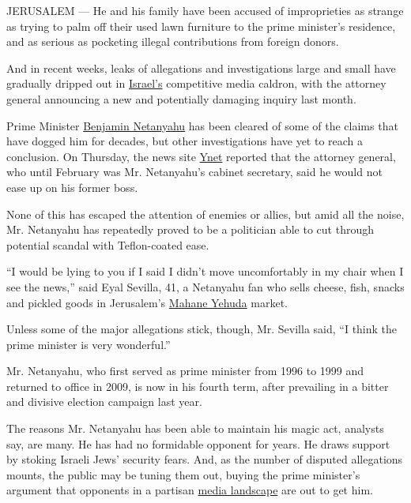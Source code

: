 JERUSALEM --- He and his family have been accused of improprieties as
strange as trying to palm off their used lawn furniture to the prime
minister's residence, and as serious as pocketing illegal contributions
from foreign donors.

And in recent weeks, leaks of allegations and investigations large and
small have gradually dripped out in
\href{http://www.nytimes.com/topic/destination/israel?inline=nyt-geo}{Israel's}
competitive media caldron, with the attorney general announcing a new
and potentially damaging inquiry last month.

Prime Minister
\href{http://www.nytimes.com/topic/person/benjamin-netanyahu?8qa}{Benjamin
Netanyahu} has been cleared of some of the claims that have dogged him
for decades, but other investigations have yet to reach a conclusion. On
Thursday, the news site
\href{http://www.ynetnews.com/home/0,7340,L-3083,00.html}{Ynet} reported
that the attorney general, who until February was Mr. Netanyahu's
cabinet secretary, said he would not ease up on his former boss.

None of this has escaped the attention of enemies or allies, but amid
all the noise, Mr. Netanyahu has repeatedly proved to be a politician
able to cut through potential scandal with Teflon-coated ease.

``I would be lying to you if I said I didn't move uncomfortably in my
chair when I see the news,'' said Eyal Sevilla, 41, a Netanyahu fan who
sells cheese, fish, snacks and pickled goods in Jerusalem's
\href{http://en.machne.co.il/}{Mahane Yehuda} market.

Unless some of the major allegations stick, though, Mr. Sevilla said,
``I think the prime minister is very wonderful.''

Mr. Netanyahu, who first served as prime minister from 1996 to 1999 and
returned to office in 2009, is now in his fourth term, after prevailing
in a bitter and divisive election campaign last year.

The reasons Mr. Netanyahu has been able to maintain his magic act,
analysts say, are many. He has had no formidable opponent for years. He
draws support by stoking Israeli Jews' security fears. And, as the
number of disputed allegations mounts, the public may be tuning them
out, buying the prime minister's argument that opponents in a partisan
\href{http://www.nytimes.com/2016/07/31/opinion/sunday/how-benjamin-netanyahu-is-crushing-israels-free-press.html?rref=collection\%2Ftimestopic\%2FIsrael\&action=click\&contentCollection=world\&region=stream\&module=stream_unit\&version=latest\&contentPlacement=1\&pgtype=collection}{media
landscape} are out to get him.

